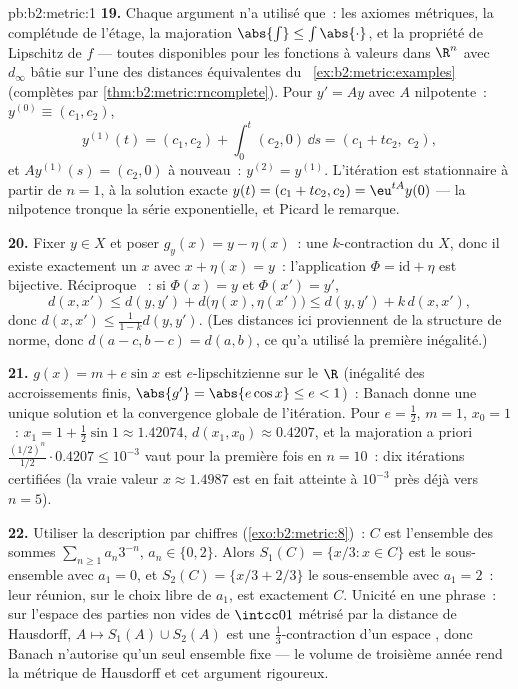 \begin{solution}{pb:b2:metric:1}
\textbf{19.} Chaque argument n'a utilisé que~: les axiomes
métriques, la complétude de l'étage, la majoration $\abs{\int} \leq
\int\abs{\cdot}$, et la propriété de Lipschitz de $f$ --- toutes
disponibles pour les fonctions à valeurs dans $\R^n$ avec $d_\infty$
bâtie sur l'une des distances équivalentes du~%
\cref{ex:b2:metric:examples} (complètes par
\cref{thm:b2:metric:rncomplete}). Pour $y' = Ay$ avec $A$
nilpotente~: $y^{(0)} \equiv (c_1, c_2)$,
\[
y^{(1)}(t) = (c_1, c_2) + \int_0^t (c_2, 0)\,\dd s
= (c_1 + tc_2,\; c_2),
\]
et $Ay^{(1)}(s) = (c_2, 0)$ à nouveau~: $y^{(2)} = y^{(1)}$.
L'itération est stationnaire à partir de $n = 1$, à la solution
exacte $y(t) = (c_1 + tc_2, c_2) = \eu^{tA}y(0)$ --- la nilpotence
tronque la série exponentielle, et Picard le remarque.

\textbf{20.} Fixer $y \in X$ et poser $g_y(x) = y - \eta(x)$~: une
$k$-contraction du  $X$, donc il existe exactement un $x$ avec
$x + \eta(x) = y$~: l'application $\Phi = \mathrm{id} + \eta$ est
bijective. Réciproque ~: si $\Phi(x) = y$ et $\Phi(x')
= y'$,
\[
d(x, x') \leq d(y, y') + d\bigl(\eta(x), \eta(x')\bigr)
\leq d(y, y') + k\,d(x, x'),
\]
donc $d(x, x') \leq \frac{1}{1-k}d(y, y')$. (Les distances ici
proviennent de la structure de norme, donc $d(a - c, b - c) = d(a,
b)$, ce qu'a utilisé la première inégalité.)

\textbf{21.} $g(x) = m + e\sin x$ est $e$-lipschitzienne sur le
 $\R$ (inégalité des accroissements finis, $\abs{g'} =
\abs{e\cos x} \leq e < 1$)~: Banach donne une unique solution et la
convergence globale de l'itération. Pour $e = \frac12$, $m = 1$, $x_0
= 1$~: $x_1 = 1 + \frac12\sin 1 \approx 1.42074$, $d(x_1, x_0)
\approx 0.4207$, et la majoration a priori $\frac{(1/2)^n}{1/2}\cdot
0.4207 \leq 10^{-3}$ vaut pour la première fois en $n = 10$~: dix
itérations certifiées (la vraie valeur $x \approx 1.4987$ est en fait
atteinte à $10^{-3}$ près déjà vers $n = 5$).

\textbf{22.} Utiliser la description par chiffres
(\cref{exo:b2:metric:8})~: $C$ est l'ensemble des sommes
$\sum_{n\geq1}a_n3^{-n}$, $a_n \in \{0, 2\}$. Alors $S_1(C) = \{x/3 :
x \in C\}$ est le sous-ensemble avec $a_1 = 0$, et $S_2(C) = \{x/3 +
2/3\}$ le sous-ensemble avec $a_1 = 2$~: leur réunion, sur le choix
libre de $a_1$, est exactement $C$. Unicité en une phrase~: sur
l'espace des parties  non vides de $\intcc01$ métrisé par la
distance de Hausdorff, $A \mapsto S_1(A) \cup S_2(A)$ est une
$\frac13$-contraction d'un espace , donc Banach n'autorise
qu'un seul ensemble fixe --- le volume de troisième année rend la
métrique de Hausdorff et cet argument rigoureux.


\end{solution}
